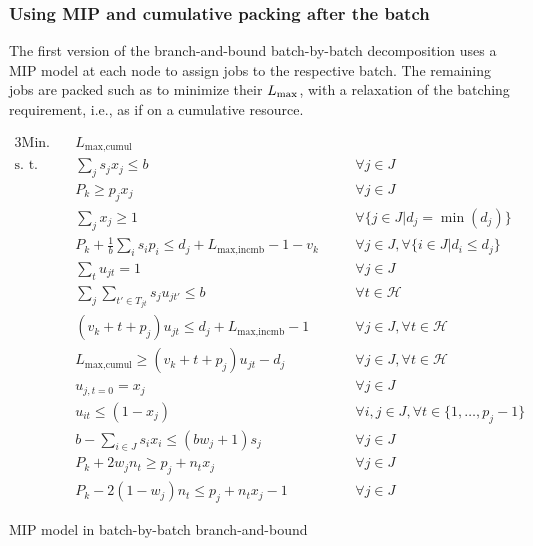 \subsubsection{Using MIP and cumulative packing after the batch}

The first version of the branch-and-bound batch-by-batch decomposition uses a
MIP model at each node to assign jobs to the respective batch. The remaining
jobs are packed such as to minimize their $L_{\text{max}}$, with a relaxation of the
batching requirement, i.e., as if on a cumulative resource. 
\begin{model}[h!]
\begin{alignat}{3}
\text{Min.}\quad & L_{\text{max,cumul}} && \\ 
\text{s. t.}\quad & \label{dc:eq1} \sum_j s_j x_j \leq b \quad && \forall j \in J \\
& P_k \geq p_j x_j \quad && \forall j \in J \\
& \label{dc:eq3} \sum_j x_j \geq 1 \quad && \forall \{j \in J | d_j = \min(d_j)\} \\
& \label{dc:eq4} P_k + \frac{1}{b} \sum_{i} s_i p_i \leq d_j +
L_{\text{max,incmb}} - 1 - v_k \quad && \forall j \in J, \forall \{i \in J | d_i
\leq d_j\} \\[2ex]
& \label{dc:eq5} \sum_t u_{jt} = 1 \quad && \forall j \in J \\
& \label{dc:eq6} \sum_j \sum_{t' \in T_{jt}} s_j u_{jt'} \leq b \quad && \forall t \in \mathcal{H} \\
& \label{dc:eq7} (v_k + t + p_j) u_{jt} \leq d_j + L_{\text{max,incmb}} - 1 \quad && \forall j \in J, \forall t \in \mathcal{H} \\
& \label{dc:eq8} L_{\text{max,cumul}} \geq (v_k + t + p_j) u_{jt} - d_j \quad && \forall j \in J, \forall t \in \mathcal{H} \\
& \label{dc:eq9} u_{j,t=0} = x_j \quad && \forall j \in J \\
& \label{dc:eq10} u_{it} \leq (1 - x_j) \quad && \forall i,j \in J, \forall t
\in \{1, \dots, p_j - 1\} \\[2ex]
& \label{dc:eq11} b - \sum_{i \in J} s_i x_i \leq (b w_j + 1) s_j \quad && \forall j \in J \\
& \label{dc:eq12} P_k + 2w_j n_t \geq p_j + n_t x_j \quad && \forall j \in J\\
& \label{dc:eq13} P_k - 2(1 - w_j)n_t \leq p_j +n_t x_j - 1 \quad && \forall j
\in J
\end{alignat}
\caption{MIP model in batch-by-batch branch-and-bound}
\label{model:decomp_mip}
\end{model}

